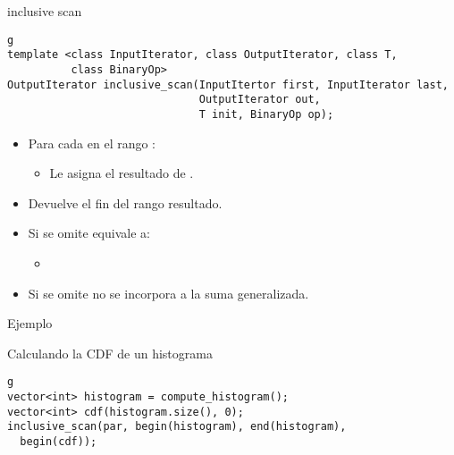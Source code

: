 \begin{frame}[t,fragile]{inclusive scan}
\begin{lstlisting}g
template <class InputIterator, class OutputIterator, class T, 
          class BinaryOp>
OutputIterator inclusive_scan(InputItertor first, InputIterator last, 
                              OutputIterator out,
                              T init, BinaryOp op);
\end{lstlisting}
\begin{itemize}
  \item Para cada  en el rango \cppid{[out, out + (last-first))}:
    \begin{itemize}
      \item Le asigna el resultado de 
        .
    \end{itemize}
  \item Devuelve el fin del rango resultado.
  \vfill
  \item Si se omite  equivale a:
    \begin{itemize}
      \item {}
    \end{itemize}
  \item Si se omite  no se incorpora a la suma generalizada.
\end{itemize}
\end{frame}

\begin{frame}[t,fragile]{Ejemplo}
\begin{block}{Calculando la CDF de un histograma}
\begin{lstlisting}g
vector<int> histogram = compute_histogram();
vector<int> cdf(histogram.size(), 0);
inclusive_scan(par, begin(histogram), end(histogram),
  begin(cdf));
\end{lstlisting}
\end{block}
\end{frame}

